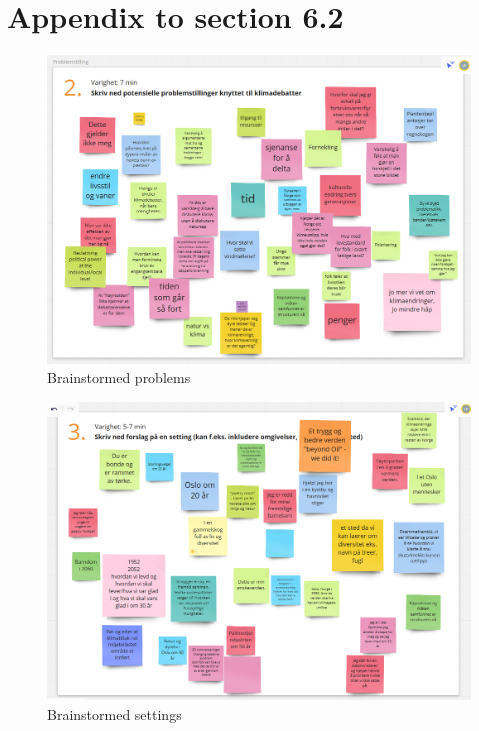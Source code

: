 

\section{Appendix to section 6.2}

\begin{figure}[H]
    \centering 
    \includegraphics[width=12.5cm]{pictures/appendix/narrative/problemstilling.PNG}
    \caption{Brainstormed problems}
\end{figure}

\begin{figure}[H]
    \centering 
    \includegraphics[width=12.5cm]{pictures/appendix/narrative/setting.PNG}
    \caption{Brainstormed settings}
\end{figure}

